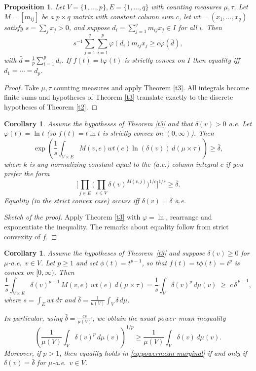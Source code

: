\documentclass[final,1p,times]{elsarticle}
\newtheorem{prop}[thm]{Proposition}
\newtheorem{cor}[thm]{Corollary}
\begin{document}
\vspace{1cm}


\begin{prop}\label{cor:discrete}
Let $V=\{1,\dots,p\}, E=\{1,\dots,q\}$ with counting measures $\mu,\tau$.  
Let $M=[m_{ij}]$ be a $p\times q$ matrix with constant column sum $c$, let $wt=(x_1,\dots,x_q)$ satisfy $s=\sum_j x_j>0$, and suppose
$d_i=\sum_{j=1}^q m_{ij}x_j\in I$ for all $i$.  Then
\[
s^{-1}\sum_{j=1}^q\sum_{i=1}^p \varphi(d_i) m_{ij} x_j \ge c\varphi(\bar d),
\]
with $\bar d=\frac1p\sum_{i=1}^p d_i$.  If $f(t)=t\varphi(t)$ is strictly convex on $I$ then equality iff $d_1=\cdots=d_p$.
\end{prop}

\begin{proof}
Take $\mu,\tau$ counting measures and apply Theorem \ref{t3}.  All integrals become finite sums and hypotheses of Theorem \ref{t3} translate exactly to the discrete hypotheses of Theorem \ref{t2}.
\end{proof}

\begin{cor}\label{cor:geometric}
Assume the hypotheses of Theorem \ref{t3} and that $\delta(v)>0$ a.e. Let $\varphi(t)=\ln t$ (so $f(t)=t\ln t$ is strictly convex on $(0,\infty)$). Then
\[
\exp\!\left(\frac{1}{s}\int_{V\times E} M(v,e)wt(e)\ln(\delta(v))\,d(\mu\times\tau)\right)
\ge \bar\delta,
\]
where $k$ is any normalizing constant equal to the (a.e.) column integral $c$ if you prefer the form
\[
\Big[\prod_{j\in E}\Big(\prod_{v\in V}\delta(v)^{M(v,j)}\Big)^{1/c}\Big]^{1/s}\ge \bar\delta.
\]
Equality (in the strict convex case) occurs iff $\delta(v)=\bar\delta$ a.e.
\end{cor}

\begin{proof}[Sketch of the proof]
Apply Theorem \ref{t3} with $\varphi=\ln$, rearrange and exponentiate the inequality. The remarks about equality follow from strict convexity of $f$.
\end{proof}

\begin{cor}
\label{cor:powermean}
Assume the hypotheses of Theorem~\ref{t3} and suppose $\delta(v)\ge 0$ for $\mu$-a.e.\ $v\in V$.
Let $p\ge 1$ and set $\phi(t)=t^{p-1}$, so that $f(t)=t\phi(t)=t^p$ is convex on $[0,\infty)$.
Then
\begin{equation}
\label{eq:powermean-product}
\frac{1}{s}\int_{V\times E}\delta(v)^{p-1}\,M(v,e)\,wt(e)\,d(\mu\times\tau)
=
\frac{1}{s}\int_V \delta(v)^p\,d\mu(v)
\;\ge\;
c\,\bar\delta^{\,p-1},
\end{equation}
where $s=\int_E wt\,d\tau$ and $\bar\delta=\frac{1}{\mu(V)}\int_V \delta\,d\mu$.

In particular, using $\bar\delta=\frac{cs}{\mu(V)}$, we obtain the usual power--mean inequality
\begin{equation}
\label{eq:powermean-marginal}
\left(\frac{1}{\mu(V)}\int_V \delta(v)^p\,d\mu(v)\right)^{1/p}
\ge
\frac{1}{\mu(V)}\int_V \delta(v)\,d\mu(v).
\end{equation}
Moreover, if $p>1$, then equality holds in \eqref{eq:powermean-marginal} if and only if
$\delta(v)=\bar\delta$ for $\mu$-a.e.\ $v\in V$.
\end{cor}
\end{document}
